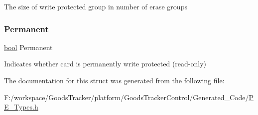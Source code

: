 The size of write protected group in number of erase groups \mbox{\label{struct_l_d_d___s_d_h_c___t_card_write_protect_aba3541b5fb538841312161ab0e479606}} 
\subsubsection{\texorpdfstring{Permanent}{Permanent}}
{\footnotesize\ttfamily \hyperlink{group___p_e___types__module_ga97a80ca1602ebf2303258971a2c938e2}{bool} Permanent}

Indicates whether card is permanently write protected (read-\/only) 

The documentation for this struct was generated from the following file\+:\begin{DoxyCompactItemize}
\item 
F\+:/workspace/\+Goods\+Tracker/platform/\+Goods\+Tracker\+Control/\+Generated\+\_\+\+Code/\hyperlink{_p_e___types_8h}{P\+E\+\_\+\+Types.\+h}\end{DoxyCompactItemize}
